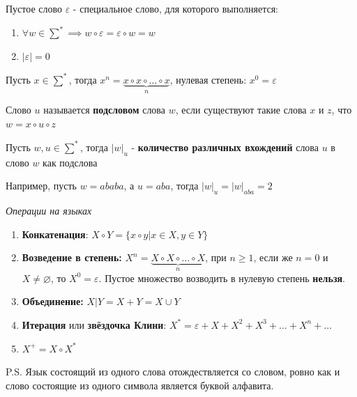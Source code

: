 \begin{multicols}{2}
  \begin{definition}{}{}
      $\textbf{Пустое слово } \varepsilon$ - специальное слово, для которого выполняется:
      \begin{enumerate}
          \item $\forall w \in \sum^{*} \implies w \circ \varepsilon = \varepsilon \circ w = w$
          \item $|\varepsilon| = 0$
      \end{enumerate}
  \end{definition}
  
  \begin{definition}{}{}
      Пусть $x \in \sum^{*}$, тогда $x^n = \underbrace{x \circ x  \circ \dots \circ x}_{n}$, нулевая степень: $x^0 = \varepsilon$
  
  \end{definition}
  \begin{definition}{}{}
      Слово $u$ называется \textbf{подсловом} слова $w$, если существуют такие слова $x$ и $z$, что $w = x\circ u \circ z$
  \end{definition}
  
  
  \begin{definition}{}{}
      Пусть $w, u \in \sum^{*}$, тогда $|w|_{u}$ - \textbf{количество различных вхождений} слова $u$ в слово $w$ как подслова
  \end{definition}
  Например, пусть $w = ababa$, а $u = aba$, тогда $|w|_u = |w|_{aba} = 2$
  
  \begin{center}
      \textit{Операции на языках}
  \end{center}
  
  \begin{enumerate}
      \item \textbf{Конкатенация}: $X \circ Y = \{ x \circ y | x \in X, y \in Y\}$
      \item \textbf{Возведение в степень:} $X^n = \underbrace{X\circ X \circ \dots \circ X}_{n}$, при $n \geqslant 1$, если же $n = 0$ и $X \neq \varnothing$, то $X^0 = \varepsilon$. Пустое множество возводить в нулевую степень \textbf{нельзя}.
      \item \textbf{Объединение:} $X|Y = X + Y = X \cup Y$
      \item \textbf{Итерация} или \textbf{звёздочка Клини}: $X^{*} = \varepsilon + X + X^2 + X^3 + \dotsc + X^n + \dotsc$
      \item $X^+ = X \circ X^*$
  \end{enumerate}
  P.S. Язык состоящий из одного слова отождествляется со словом, ровно как и слово состоящие из одного символа является буквой алфавита.
  

\end{multicols}
